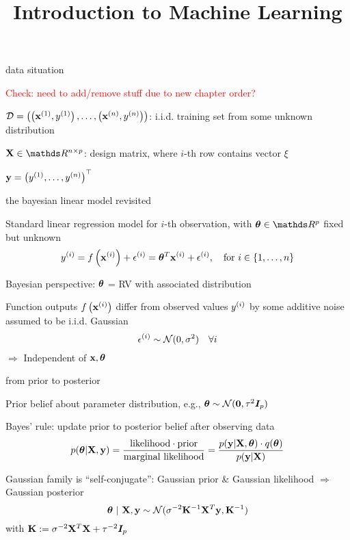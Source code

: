 \documentclass[11pt,compress,t,notes=noshow, xcolor=table]{beamer}
\title{Introduction to Machine Learning}
\begin{document}


\begin{framei}{data situation}
\item \textcolor{red}{Check: need to add/remove stuff due to new chapter order?}
\item $\mathcal{D} = \left( \left(\mathbf{x}^{(1)}, y^{(1)}\right), \ldots, \left(\mathbf{x}^{(n)}, y^{(n)}\right)\right)$: i.i.d. training set from some unknown distribution
\item $\Xmat \in \R^{n \times p}$: design matrix, where $i$-th row contains vector $\xi$
\item $\mathbf{y} = \left(y^{(1)}, \hdots, y^{(n)}\right)^\top$
\end{framei}

\begin{framei}[sep=L]{the bayesian linear model revisited}
\item Standard linear regression model for $i$-th observation, with $\thetav \in \R^p$ fixed but unknown
$$y^{(i)} = f\left(\mathbf{x}^{(i)}\right) + \epsilon^{(i)} = \bm{\theta}^T \mathbf{x}^{(i)} + \epsilon^{(i)}, \quad \text{for } i \in \{1, \ldots, n\}$$
\item Bayesian perspective: $\bm{\theta}$ = RV with associated distribution
\item Function outputs $f\left(\mathbf{x}^{(i)}\right)$ differ from observed values $y^{(i)}$ by some additive noise assumed to be i.i.d. Gaussian
$$\epsilon^{(i)} \sim \mathcal{N}(0, \sigma^2) \quad \forall i$$ 
$\Rightarrow$ Independent of $\mathbf{x}, \bm{\theta}$
\end{framei}

\begin{framei}[sep=L]{from prior to posterior}
\item Prior belief about parameter distribution, e.g., $\bm{\theta} \sim \mathcal{N}(\mathbf{0}, \tau^2 \bm{I}_p)$
\item Bayes' rule: update prior to posterior belief after observing data
$$
p(\bm{\theta} | \mathbf{X}, \mathbf{y}) 
= \frac{\text{likelihood} \cdot \text{prior}}{\text{marginal likelihood}} 
= \frac{p(\mathbf{y} | \mathbf{X}, \bm{\theta}) \cdot q(\bm{\theta})}{p(\mathbf{y}|\mathbf{X})}
$$
\item Gaussian family is ``self-conjugate'': Gaussian prior \& Gaussian likelihood $\Rightarrow$ Gaussian posterior 
$$
\bm{\theta} ~|~ \mathbf{X}, \mathbf{y} \sim \mathcal{N}(\sigma^{-2} \mathbf{K}^{-1}\mathbf{X}^T\mathbf{y}, \mathbf{K}^{-1})
$$
with $\mathbf{K}:= \sigma^{-2}\mathbf{X}^T\mathbf{X} + \tau^{-2} \bm{I}_p$
\end{framei}
\end{document}
